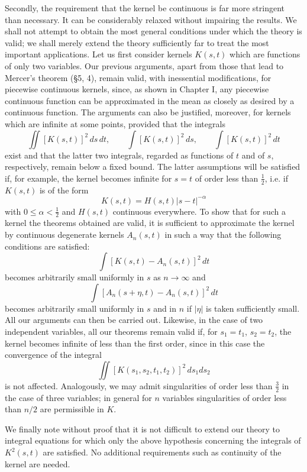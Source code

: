 Secondly, the requirement that the kernel be continuous is far more stringent than necessary. It can be considerably relaxed without impairing the results. We shall not attempt to obtain the most general conditions under which the theory is valid; we shall merely extend the theory sufficiently far to treat the most important applications. Let us first consider kernels $K(s,t)$ which are functions of only two variables. Our previous arguments, apart from those that lead to Mercer's theorem (\S5, 4), remain valid, with inessential modifications, for piecewise continuous kernels, since, as shown in Chapter I, any piecewise continuous function can be approximated in the mean as closely as desired by a continuous function. The arguments can also be justified, moreover, for kernels which are infinite at some points, provided that the integrals
\[
\iint [K(s,t)]^2\,ds\,dt,
\qquad
\int [K(s,t)]^2\,ds,
\qquad
\int [K(s,t)]^2\,dt
\]
exist and that the latter two integrals, regarded as functions of $t$ and of $s$, respectively, remain below a fixed bound. The latter assumptions will be satisfied if, for example, the kernel becomes infinite for $s=t$ of order less than $\tfrac12$, i.e. if $K(s,t)$ is of the form
\[
K(s,t)=H(s,t)|s-t|^{-\alpha}
\]
with $0\le \alpha<\tfrac12$ and $H(s,t)$ continuous everywhere. To show that for such a kernel the theorems obtained are valid, it is sufficient to approximate the kernel by continuous degenerate kernels $A_n(s,t)$ in such a way that the following conditions are satisfied:
\[
\int [K(s,t)-A_n(s,t)]^2\,dt
\]
becomes arbitrarily small uniformly in $s$ as $n\to\infty$ and
\[
\int [A_n(s+\eta,t)-A_n(s,t)]^2\,dt
\]
becomes arbitrarily small uniformly in $s$ and in $n$ if $|\eta|$ is taken sufficiently small. All our arguments can then be carried out. Likewise, in the case of two independent variables, all our theorems remain valid if, for $s_1=t_1$, $s_2=t_2$, the kernel becomes infinite of less than the first order, since in this case the convergence of the integral
\[
\iint [K(s_1,s_2,t_1,t_2)]^2\,ds_1ds_2
\]
is not affected. Analogously, we may admit singularities of order less than $\tfrac32$ in the case of three variables; in general for $n$ variables singularities of order less than $n/2$ are permissible in $K$.

We finally note without proof that it is not difficult to extend our theory to integral equations for which only the above hypothesis concerning the integrals of $K^2(s,t)$ are satisfied. No additional requirements such as continuity of the kernel are needed.

